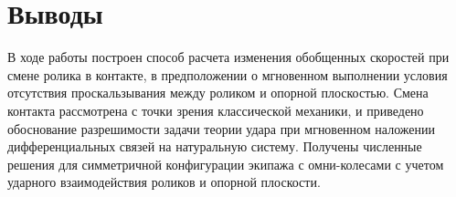 
\section{Выводы}

В ходе работы построен способ расчета изменения обобщенных скоростей при смене ролика в контакте, в предположении о мгновенном выполнении условия отсутствия проскальзывания между роликом и опорной плоскостью. Смена контакта рассмотрена с точки зрения классической механики, и приведено обоснование разрешимости задачи теории удара при мгновенном наложении дифференциальных связей на натуральную систему. Получены численные решения для симметричной конфигурации экипажа с омни-колесами с учетом ударного взаимодействия роликов и опорной плоскости.
